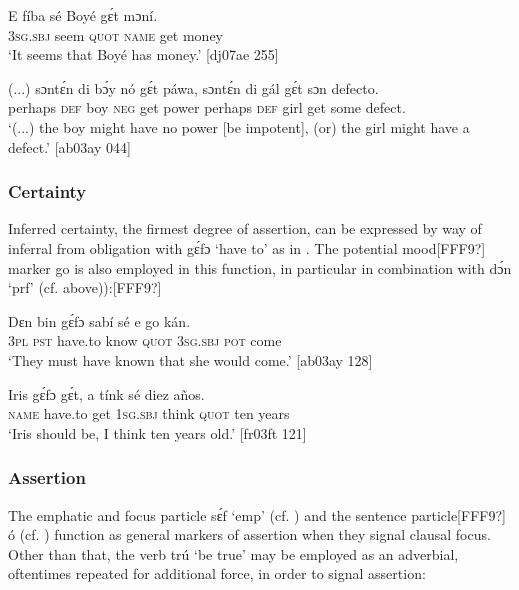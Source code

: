 \ea%
    \label{ex:key:451}
    \gll E    fíba    sé    Boyé  gɛ́t  mɔní. \\
\textsc{3sg.sbj}  seem  \textsc{quot}    \textsc{name}  get  money\\

\glt ‘It seems that Boyé has money.’ [dj07ae 255]
\z


\ea%
    \label{ex:key:452}
    \gll (...)  sɔntɛ́n  di  bɔ́y  nó  gɛ́t  páwa,  sɔntɛ́n  di  gál
gɛ́t  sɔn    defecto.\\
{} perhaps  \textsc{def}  boy  \textsc{neg}  get  power  perhaps  \textsc{def}  girl
get  some  defect.\\

\glt ‘(...) the boy might have no power [be impotent], (or) the girl 
 might have a defect.’ [ab03ay 044]
\z

\subsubsection{Certainty}\label{sec:6.7.4.3}

Inferred certainty, the firmest degree of assertion, can be expressed by way of inferral from obligation with gɛ́fɔ ‘have to’ as in . The potential mood[FFF9?] marker go is also employed in this function, in particular in combination with dɔ́n ‘prf’ (cf.  above)):[FFF9?]


\ea%
    \label{ex:key:453}
    \gll Dɛn    bin  gɛ́fɔ    sabí    sé    e    go  kán.\\
\textsc{3pl}    \textsc{pst}  have.to  know  \textsc{quot}    \textsc{3sg.sbj}  \textsc{pot}  come\\

\glt ‘They must have known that she would come.’ [ab03ay 128]
\z


\ea%
    \label{ex:key:454}
    \gll Iris    gɛ́fɔ    gɛ́t,  a    tínk    sé    diez  años.\\
\textsc{name}  have.to  get  \textsc{1sg.sbj}  think  \textsc{quot}    ten  years\\

\glt ‘Iris should be, I think ten years old.’ [fr03ft 121]
\z

\subsubsection{Assertion}\label{sec:6.7.4.4}

The emphatic and focus particle sɛ́f ‘emp’ (cf. ) and the sentence particle[FFF9?] ó (cf. ) function as general markers of assertion when they signal clausal focus. Other than that, the verb trú ‘be true’ may be employed as an adverbial, oftentimes repeated for additional force, in order to signal assertion:


